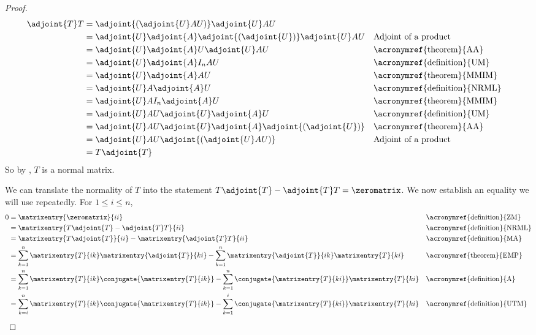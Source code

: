 \begin{proof}
%
\begin{align*}
\adjoint{T}T
&=\adjoint{\left(\adjoint{U}AU\right)}\adjoint{U}AU\\
&=\adjoint{U}\adjoint{A}\adjoint{\left(\adjoint{U}\right)}\adjoint{U}AU&&\text{Adjoint of a product}\\
&=\adjoint{U}\adjoint{A}U\adjoint{U}AU&&\text{\acronymref{theorem}{AA}}\\
&=\adjoint{U}\adjoint{A}I_nAU&&\text{\acronymref{definition}{UM}}\\
&=\adjoint{U}\adjoint{A}AU&&\text{\acronymref{theorem}{MMIM}}\\
&=\adjoint{U}A\adjoint{A}U&&\text{\acronymref{definition}{NRML}}\\
&=\adjoint{U}AI_n\adjoint{A}U&&\text{\acronymref{theorem}{MMIM}}\\
&=\adjoint{U}AU\adjoint{U}\adjoint{A}U&&\text{\acronymref{definition}{UM}}\\
&=\adjoint{U}AU\adjoint{U}\adjoint{A}\adjoint{\left(\adjoint{U}\right)}&&\text{\acronymref{theorem}{AA}}\\
&=\adjoint{U}AU\adjoint{\left(\adjoint{U}AU\right)}&&\text{Adjoint of a product}\\
&=T\adjoint{T}
\end{align*}
%
So by , $T$ is a normal matrix.\par
%
We can translate the normality of $T$ into the statement $T\adjoint{T}-\adjoint{T}T=\zeromatrix$.  We now establish an equality we will use repeatedly.  For $1\leq i\leq n$,
%
\begin{align*}
0
&=\matrixentry{\zeromatrix}{ii}&&\text{\acronymref{definition}{ZM}}\\
&=\matrixentry{T\adjoint{T}-\adjoint{T}T}{ii}&&\text{\acronymref{definition}{NRML}}\\
&=\matrixentry{T\adjoint{T}}{ii}-\matrixentry{\adjoint{T}T}{ii}&&\text{\acronymref{definition}{MA}}\\
&=
 \sum_{k=1}^{n}\matrixentry{T}{ik}\matrixentry{\adjoint{T}}{ki}
-\sum_{k=1}^{n}\matrixentry{\adjoint{T}}{ik}\matrixentry{T}{ki}
&&\text{\acronymref{theorem}{EMP}}\\
&=
 \sum_{k=1}^{n}\matrixentry{T}{ik}\conjugate{\matrixentry{T}{ik}}
-\sum_{k=1}^{n}\conjugate{\matrixentry{T}{ki}}\matrixentry{T}{ki}
&&\text{\acronymref{definition}{A}}\\
&=
 \sum_{k=i}^{n}\matrixentry{T}{ik}\conjugate{\matrixentry{T}{ik}}
-\sum_{k=1}^{i}\conjugate{\matrixentry{T}{ki}}\matrixentry{T}{ki}
&&\text{\acronymref{definition}{UTM}}\\

\end{align*}
\end{proof}
